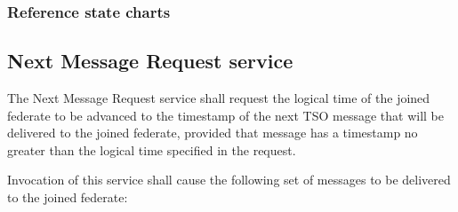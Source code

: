 \begin{compactstdpage}
    \subsubsection{Reference state charts}


    \subsection{Next Message Request service}

    The Next Message Request service shall request the logical time of the joined federate to be advanced to the timestamp of the next TSO message that will be delivered to the joined federate, provided that message has a timestamp no greater than the logical time specified in the request.

    Invocation of this service shall cause the following set of messages to be delivered to the joined federate:



\end{compactstdpage}

\clearpage


